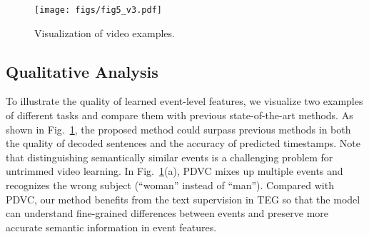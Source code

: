 \begin{figure}[]
    \centering
    \texttt{[image: figs/fig5\_v3.pdf]}
         \vspace{-2.2em}
    \caption{Visualization of video examples.}
    \label{fig:qa}
    \vspace{-1.5em}
\end{figure}

\subsection{Qualitative Analysis}
To illustrate the quality of learned event-level features, we visualize two examples of different tasks and compare them with previous state-of-the-art methods. As shown in Fig.~\ref{fig:qa}, the proposed method could surpass previous methods in both the quality of decoded sentences and the accuracy of predicted timestamps. Note that distinguishing semantically similar events is a challenging problem for untrimmed video learning. In Fig.~\ref{fig:qa}(a), PDVC mixes up multiple events and recognizes the wrong subject (``woman'' instead of ``man''). Compared with PDVC, our method benefits from the text supervision in TEG so that the model can understand fine-grained differences between events and preserve more accurate semantic information in event features.

